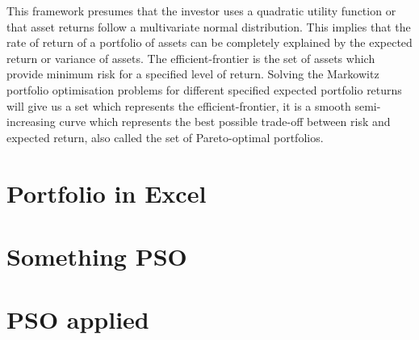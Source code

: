 \documentclass{pdfmx4020}
\begin{document}
    This framework presumes that the investor uses a quadratic utility function or that asset returns follow a multivariate normal distribution. This implies that the rate of return of a portfolio of assets can be completely explained by the expected return or variance of assets. The efficient-frontier is the set of assets which provide minimum risk for a specified level of return. Solving the Markowitz portfolio optimisation problems for different specified expected portfolio returns will give us a set which represents the efficient-frontier, it is a smooth semi-increasing curve which represents the best possible trade-off between risk and expected return, also called the set of Pareto-optimal portfolios. 

  



  \section{Portfolio in Excel} %
  \label{sec:portfolio_in_excel}
    

  \section{Something PSO} %
  \label{sec:something_pso}
  

  \section{PSO applied} %
  \label{sec:pso_applied}
  
\end{document}

